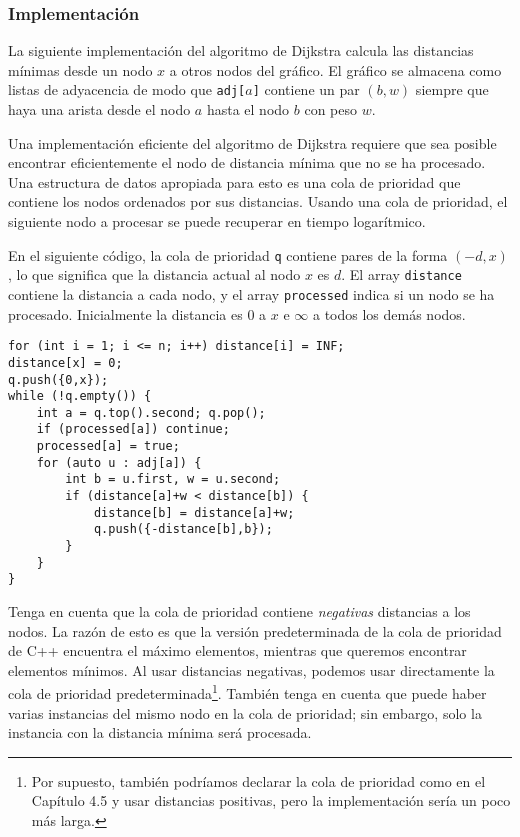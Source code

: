 \subsubsection{Implementación}

La siguiente implementación del algoritmo de Dijkstra
calcula las distancias mínimas desde un nodo $x$
a otros nodos del gráfico.
El gráfico se almacena como listas de adyacencia
de modo que \texttt{adj[$a$]} contiene un par $(b,w)$
siempre que haya una arista desde el nodo $a$ hasta el nodo $b$
con peso $w$.

Una implementación eficiente del algoritmo de Dijkstra
requiere que sea posible encontrar eficientemente el
nodo de distancia mínima que no se ha procesado.
Una estructura de datos apropiada para esto es una cola de prioridad
que contiene los nodos ordenados por sus distancias.
Usando una cola de prioridad, el siguiente nodo a procesar
se puede recuperar en tiempo logarítmico.

En el siguiente código, la cola de prioridad
\texttt{q} contiene pares de la forma $(-d,x)$,
lo que significa que la distancia actual al nodo $x$ es $d$.
El array \texttt{distance} contiene la distancia a
cada nodo, y el array \texttt{processed} indica
si un nodo se ha procesado.
Inicialmente la distancia es $0$ a $x$ e $\infty$ a todos los demás nodos.

\begin{lstlisting}
for (int i = 1; i <= n; i++) distance[i] = INF;
distance[x] = 0;
q.push({0,x});
while (!q.empty()) {
    int a = q.top().second; q.pop();
    if (processed[a]) continue;
    processed[a] = true;
    for (auto u : adj[a]) {
        int b = u.first, w = u.second;
        if (distance[a]+w < distance[b]) {
            distance[b] = distance[a]+w;
            q.push({-distance[b],b});
        }
    }
}
\end{lstlisting}

Tenga en cuenta que la cola de prioridad contiene \emph{negativas}
distancias a los nodos.
La razón de esto es que
la versión predeterminada de la cola de prioridad de C++ encuentra el máximo
elementos, mientras que queremos encontrar elementos mínimos.
Al usar distancias negativas,
podemos usar directamente la cola de prioridad predeterminada\footnote{Por
supuesto, también podríamos declarar la cola de prioridad como en el Capítulo 4.5
y usar distancias positivas, pero la implementación sería un poco más larga.}.
También tenga en cuenta que puede haber varias instancias del mismo
nodo en la cola de prioridad; sin embargo, solo la instancia con la
distancia mínima será procesada.

